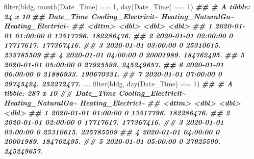 \documentclass[
]{book}
\newenvironment{Shaded}{\begin{snugshade}}{\end{snugshade}}
\newcommand{\DecValTok}[1]{\textcolor[rgb]{0.00,0.00,0.81}{#1}}
\newcommand{\DocumentationTok}[1]{\textcolor[rgb]{0.56,0.35,0.01}{\textbf{\textit{#1}}}}
\newcommand{\FunctionTok}[1]{\textcolor[rgb]{0.00,0.00,0.00}{#1}}
\newcommand{\NormalTok}[1]{#1}
\newcommand{\SpecialCharTok}[1]{\textcolor[rgb]{0.00,0.00,0.00}{#1}}
\begin{document}
\begin{Shaded}
\begin{Highlighting}[]

\FunctionTok{filter}\NormalTok{(bldg, }\FunctionTok{month}\NormalTok{(Date\_Time) }\SpecialCharTok{==} \DecValTok{1}\NormalTok{, }\FunctionTok{day}\NormalTok{(Date\_Time) }\SpecialCharTok{==} \DecValTok{1}\NormalTok{)}
\DocumentationTok{\#\# \# A tibble: 24 x 10}
\DocumentationTok{\#\#    Date\_Time           Cooling\_Electricit\textasciitilde{} Heating\_NaturalGa\textasciitilde{} Heating\_Electrici\textasciitilde{}}
\DocumentationTok{\#\#    \textless{}dttm\textgreater{}                            \textless{}dbl\textgreater{}              \textless{}dbl\textgreater{}              \textless{}dbl\textgreater{}}
\DocumentationTok{\#\#  1 2020{-}01{-}01 01:00:00                   0          13517796.         182286476.}
\DocumentationTok{\#\#  2 2020{-}01{-}01 02:00:00                   0          17717617.         177367416.}
\DocumentationTok{\#\#  3 2020{-}01{-}01 03:00:00                   0          25310615.         235785509 }
\DocumentationTok{\#\#  4 2020{-}01{-}01 04:00:00                   0          20001989.         184762495.}
\DocumentationTok{\#\#  5 2020{-}01{-}01 05:00:00                   0          27925599.         245249657.}
\DocumentationTok{\#\#  6 2020{-}01{-}01 06:00:00                   0          21886933.         190670331.}
\DocumentationTok{\#\#  7 2020{-}01{-}01 07:00:00                   0          29745424.         252272477.}
\NormalTok{....}
\FunctionTok{filter}\NormalTok{(bldg, }\FunctionTok{day}\NormalTok{(Date\_Time) }\SpecialCharTok{==} \DecValTok{1}\NormalTok{)}
\DocumentationTok{\#\# \# A tibble: 287 x 10}
\DocumentationTok{\#\#    Date\_Time           Cooling\_Electricit\textasciitilde{} Heating\_NaturalGa\textasciitilde{} Heating\_Electrici\textasciitilde{}}
\DocumentationTok{\#\#    \textless{}dttm\textgreater{}                            \textless{}dbl\textgreater{}              \textless{}dbl\textgreater{}              \textless{}dbl\textgreater{}}
\DocumentationTok{\#\#  1 2020{-}01{-}01 01:00:00                   0          13517796.         182286476.}
\DocumentationTok{\#\#  2 2020{-}01{-}01 02:00:00                   0          17717617.         177367416.}
\DocumentationTok{\#\#  3 2020{-}01{-}01 03:00:00                   0          25310615.         235785509 }
\DocumentationTok{\#\#  4 2020{-}01{-}01 04:00:00                   0          20001989.         184762495.}
\DocumentationTok{\#\#  5 2020{-}01{-}01 05:00:00                   0          27925599.         245249657.}

\end{Highlighting}
\end{Shaded}
\end{document}
